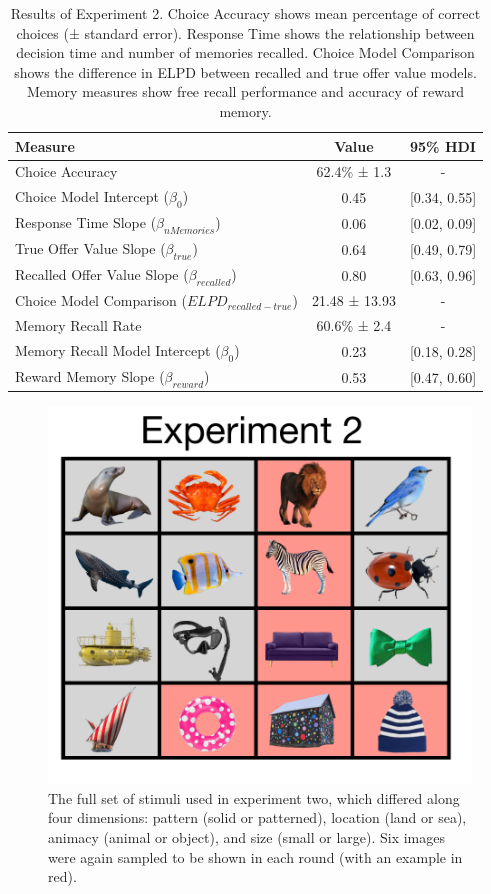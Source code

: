 \documentclass[10pt,letterpaper]{article}
\begin{document}
\clearpage
\begin{table}[t]
\centering
\begin{tabular}{lcc}
\hline
Measure & Value & 95\% HDI \\
\hline
Choice Accuracy & 62.4\% ± 1.3 & - \\
Choice Model Intercept ($\beta_0$) & 0.45 & [0.34, 0.55] \\
Response Time Slope ($\beta_{nMemories}$) & 0.06 & [0.02, 0.09] \\
True Offer Value Slope ($\beta_{true}$) & 0.64 & [0.49, 0.79] \\
Recalled Offer Value Slope ($\beta_{recalled}$) & 0.80 & [0.63, 0.96] \\
Choice Model Comparison ($ELPD_{recalled-true}$) & 21.48 ± 13.93 & - \\
Memory Recall Rate & 60.6\% ± 2.4 & - \\
Memory Recall Model Intercept ($\beta_0$) & 0.23 & [0.18, 0.28] \\
Reward Memory Slope ($\beta_{reward}$) & 0.53 & [0.47, 0.60] \\
\hline
\end{tabular}
\caption{Results of Experiment 2. Choice Accuracy shows mean percentage of correct choices (± standard error). Response Time shows the relationship between decision time and number of memories recalled. Choice Model Comparison shows the difference in ELPD between recalled and true offer value models. Memory measures show free recall performance and accuracy of reward memory.}
\label{tab:SuppExp2}
\end{table}

 \clearpage
\begin{figure}[h]
    \centering
    \includegraphics[width=0.4
    \textwidth]{figures/FigureS1.pdf}
    \caption{The full set of stimuli used in experiment two, which differed along four dimensions: pattern (solid or patterned), location (land or sea), animacy (animal or object), and size (small or large). Six images were again sampled to be shown in each round (with an example in red).}
    \label{fig:suppFig1}
\end{figure}
\end{document}
